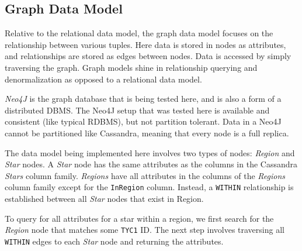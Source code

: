 \subsection{Graph Data Model}\label{subsec:graphDataModel}
Relative to the relational data model, the graph data model focuses on the relationship between various tuples.
Here data is stored in nodes as attributes, and relationships are stored as edges between nodes.
Data is accessed by simply traversing the graph.
Graph models shine in relationship querying and denormalization as opposed to a relational data model.

\textit{Neo4J} is the graph database that is being tested here, and is also a form of a distributed DBMS\@.
The Neo4J setup that was tested here is available and consistent (like typical RDBMS), but not partition tolerant.
Data in a Neo4J cannot be partitioned like Cassandra, meaning that every node is a full replica.

The data model being implemented here involves two types of nodes: \textit{Region} and \textit{Star} nodes.
A \textit{Star} node has the same attributes as the columns in the Cassandra \textit{Stars} column family.
\textit{Regions} have all attributes in the columns of the \textit{Regions} column family except for the
\texttt{InRegion} column.
Instead, a \texttt{WITHIN} relationship is established between all \textit{Star} nodes that exist in Region.

To query for all attributes for a star within a region, we first search for the \textit{Region} node that matches
some \texttt{TYC1} ID\@.
The next step involves traversing all \texttt{WITHIN} edges to each \textit{Star} node and returning the attributes.